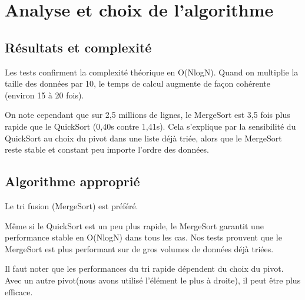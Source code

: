 \section{Analyse et choix de l'algorithme}

\subsection{Résultats et complexité}
Les tests confirment la complexité théorique en O(NlogN).
Quand on multiplie la taille des données par 10,
le temps de calcul augmente de façon cohérente (environ 15 à 20 fois).

On note cependant que sur 2,5 millions de lignes,
le MergeSort est 3,5 fois plus rapide que le QuickSort (0,40s contre 1,41s).
Cela s'explique par la sensibilité du QuickSort au choix du pivot dans une liste déjà triée,
alors que le MergeSort reste stable et constant peu importe l'ordre des données.

\subsection{Algorithme approprié}
Le tri fusion (MergeSort) est préféré.

Même si le QuickSort est un peu plus rapide,
le MergeSort garantit une performance stable en O(NlogN) dans tous les cas.
Nos tests prouvent que le MergeSort est plus performant sur de gros volumes de données déjà triées.

Il faut noter que les performances du tri rapide dépendent du choix du pivot.
Avec un autre pivot(nous avons utilisé l'élément le plus à droite), il peut être plus efficace.
